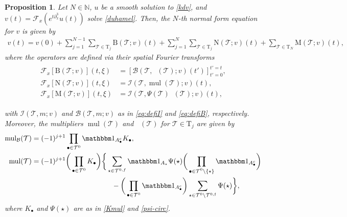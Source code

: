 \documentclass[%
11pt,  reqno]{amsart}
\newcommand{\5}{\textup{V}}
\newcommand{\noi}{\noindent}
\newcommand{\ind}{\mathbbm 1}
\newcommand{\dx}{\partial_x}
\newtheorem{proposition}[theorem]{Proposition}
\theoremstyle{remark}
\newcommand{\bul}{\bullet}
\newcommand{\TT}{\mathcal{T}}
\newcommand{\Tr}{\mathrm{T}}
\newcommand{\Ft}{{\mathcal{F}}}
\newcommand{\ff}{\mathfrak{f}}
\newcommand{\N}{\mathbb{N}}
\DeclareMathOperator{\mul}{mul}
\DeclareMathOperator{\mulB}{mul_{\mathcal{B}}}
\newcommand{\B}{\mathcal{B}}
\newcommand{\Ical}{\mathcal{I}}
\numberwithin{equation}{section}
\numberwithin{theorem}{section}
\newcommand{\MM}{\mathrm{M}}
\newcommand{\NN}{\mathrm{N}}
\newcommand{\BB}{\mathrm{B}}
\begin{document}
\begin{proposition}
\label{PRO:NFE}
Let $N\in\N$, $u$ be a smooth solution to \eqref{kdv}, and $v(t) = \Ft_x(e^{t\dx^3} u(t) )$ solve \eqref{duhamel}.
Then, 
the $N$-th normal form equation for $v$ is given by
\begin{align}
\label{NFE1}
v(t)=v(0) 
+
\sum_{j=1}^{N-1} \sum_{\TT\in \Tr_j} \BB(\TT; v) (t)
+ \sum_{j=1}^{N} \sum_{\TT\in \Tr_j} \NN(\TT; v) (t)
+ \sum_{\TT\in \Tr_{N}}
\MM(\TT; v)(t),
\end{align}
where the operators are defined via their spatial Fourier transforms
\begin{align}
\label{NFE1a}
\begin{split}
\Ft_x [\BB(\TT;v)] (t,\xi) & = \left[\B(\TT, \mulB(\TT); v)(t')\right]_{t'=0}^{t'=t},\\
\Ft_x [\NN(\TT;v)] (t,\xi) & = \Ical(\TT, \mul(\TT) ; v  )(t), \\
\Ft_x [\MM(\TT;v)] (t,\xi) & = \Ical(\TT, \Psi(\TT)\mulB(\TT); v) (t),
\end{split}
\end{align}

\noi
with $\Ical(\TT, m; v)$ and $\B(\TT, m;v )$ as in \eqref{eq:defiI} and \eqref{eq:defiB}, respectively.
Moreover,
the multipliers $\mul(\TT)$ and $\mulB(\TT)$ for $\TT\in \Tr_j$ are given by
\begin{align}
\label{NFE0b}
\begin{split}
\mulB(\TT)
& =  (-1)^{j+1}  \prod_{\bul \in \TT^0}  \ind_{A^c_{\bul}} K_\bul
,
\\
\mul(\TT) & =  (-1)^{j+1} \bigg(\prod_{\bul \in \TT^0} K_\bul \bigg) \bigg\{  \sum_{\star \in \TT^{0,f}}
\ind_{A_{\star}} \Psi(\star) \bigg(\prod_{\substack{\bul \in \TT^0 \setminus\{\star\} %
}} \ind_{A^c_{\bul}} \bigg)\\
&
\hspace{4cm}
-
\bigg( \prod_{\bul \in \TT^0} \ind_{A_\bul^c} \bigg)
\sum_{\star\in \TT^0 \setminus \TT^{0,\ff}} \Psi(\star)
 \bigg\},
\end{split}
\end{align}
where $K_\bul$ and $\Psi(\star)$ are as in \eqref{Kmul} and \eqref{psi-circ}. 

\end{proposition}
\end{document}
